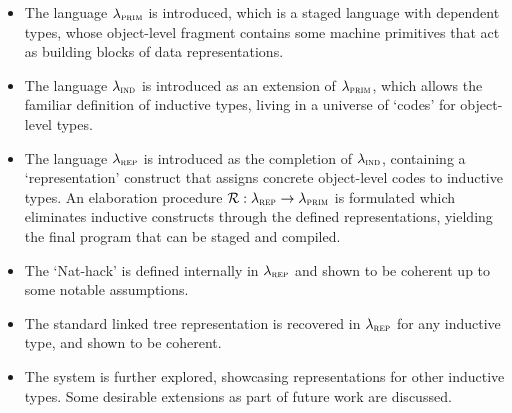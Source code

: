 \begin{itemize}
  \item The language $\lambda_{\textsc{prim}}$ is introduced, which is a staged language with
        dependent types, whose object-level fragment contains some machine primitives
        that act as building blocks of data representations.
  \item The language $\lambda_{\textsc{ind}}$ is introduced as an extension of $\lambda_{\textsc{prim}}$, which
        allows the familiar definition of inductive types, living in a universe of
        `codes' for object-level types.
  \item The language $\lambda_{\textsc{rep}}$ is introduced as the completion of $\lambda_{\textsc{ind}}$,
        containing a `representation' construct that assigns concrete object-level
        codes to inductive types. An elaboration procedure $\mathcal{R} {} : \lambda_{\textsc{rep}} \to
          \lambda_{\textsc{prim}}$ is formulated which eliminates inductive constructs through the
        defined representations, yielding the final program that can be staged and
        compiled.
  \item The `Nat-hack' is defined internally in $\lambda_{\textsc{rep}}$ and shown to be coherent
        up to some notable assumptions.
  \item The standard linked tree representation is recovered in $\lambda_{\textsc{rep}}$ for any
        inductive type, and shown to be coherent.
  \item The system is further explored, showcasing representations for other inductive
        types. Some desirable extensions as part of future work are discussed.
\end{itemize}
